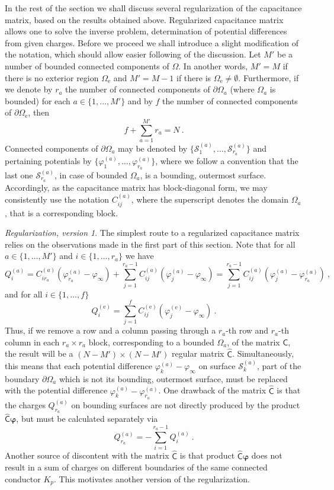 \documentclass[12pt]{iopart}
\newcommand{\dd}{\partial}
\newcommand{\be}{\begin{equation}}
\newcommand{\ee}{\end{equation}}
\newcommand{\mx}[1]{\bm{\mathsf{#1}}}
\newcommand{\0}{\vct{0}}
\theoremstyle{plain} \newtheorem{tm}{Theorem}[section]
\theoremstyle{plain} \newtheorem{lm}[tm]{Lemma}
\theoremstyle{definition} \newtheorem{defn}[tm]{Definition}
\begin{document}
\medskip

In the rest of the section we shall discuss several regularization of the capacitance matrix, based on the results obtained above. Regularized capacitance matrix allows one to solve the inverse problem, determination of potential differences from given charges. Before we proceed we shall introduce a slight modification of the notation, which should allow easier following of the discussion. Let $M'$ be a number of bounded connected components of $\Omega$. In another words, $M' = M$ if there is no exterior region $\Omega_{\mathrm{e}}$ and $M' = M-1$ if there is $\Omega_{\mathrm{e}} \ne \emptyset$. Furthermore, if we denote by $r_a$ the number of connected components of $\dd\Omega_a$ (where $\Omega_a$ is bounded) for each $a \in \{1,\dots,M'\}$ and by $f$ the number of connected components of $\dd\Omega_{\mathrm{e}}$, then
\be
f + \sum_{a=1}^{M'} r_a = N \ .
\ee
Connected components of $\dd\Omega_a$ may be denoted by $\{\mathcal{S}_1^{(a)},\dots,\mathcal{S}_{r_a}^{(a)}\}$ and pertaining potentials by $\{\varphi_1^{(a)},\dots,\varphi_{r_a}^{(a)}\}$, where we follow a convention that the last one $\mathcal{S}_{r_a}^{(a)}$, in case of bounded $\Omega_a$, is a bounding, outermost surface. Accordingly, as the capacitance matrix has block-diagonal form, we may consistently use the notation $C^{(a)}_{ij}$, where the superscript denotes the domain $\Omega_a$, that is a corresponding block.

\medskip



\emph{Regularization, version 1}. The simplest route to a regularized capacitance matrix relies on the observations made in the first part of this section. Note that for all $a \in \{1,\dots,M'\}$ and $i \in \{1,\dots,r_a\}$ we have
\be
Q_i^{(a)} = C^{(a)}_{ir_a} (\varphi_{r_a}^{(a)} - \varphi_\infty) + \sum_{j=1}^{r_a - 1} C^{(a)}_{ij} (\varphi_j^{(a)} - \varphi_\infty) = \sum_{j=1}^{r_a - 1} C^{(a)}_{ij} (\varphi_j^{(a)} - \varphi_{r_a}^{(a)}) \ ,
\ee
and for all $i \in \{1,\dots,f\}$
\be
Q_i^{(\mathrm{e})} = \sum_{j=1}^f C^{(\mathrm{e})}_{ij} (\varphi_j^{(\mathrm{e})} - \varphi_\infty) \ .
\ee
Thus, if we remove a row and a column passing through a $r_a$-th row and $r_a$-th column in each $r_a \times r_a$ block, corresponding to a bounded $\Omega_a$, of the matrix $\mx{C}$, the result will be a $(N - M') \times (N - M')$ regular matrix $\mx{\widehat{C}}$. Simultaneously, this means that each potential difference $\varphi_k^{(a)} - \varphi_\infty$ on surface $\mathcal{S}_k^{(a)}$, part of the boundary $\dd\Omega_a$ which is not its bounding, outermost surface, must be replaced with the potential difference $\varphi_k^{(a)} - \varphi_{r_a}^{(a)}$. One drawback of the matrix $\mx{\widehat{C}}$ is that the charges $Q_{r_a}^{(a)}$ on bounding surfaces are not directly produced by the product $\mx{\widehat{C}}\bm{\varphi}$, but must be calculated separately via
\be
Q_{r_a}^{(a)} = -\sum_{i=1}^{r_a - 1} Q_i^{(a)} \ .
\ee
Another source of discontent with the matrix $\mx{\widehat{C}}$ is that product $\mx{\widehat{C}}\bm{\varphi}$ does not result in a sum of charges on different boundaries of the same connected conductor $K_p$. This motivates another version of the regularization.
\end{document}
